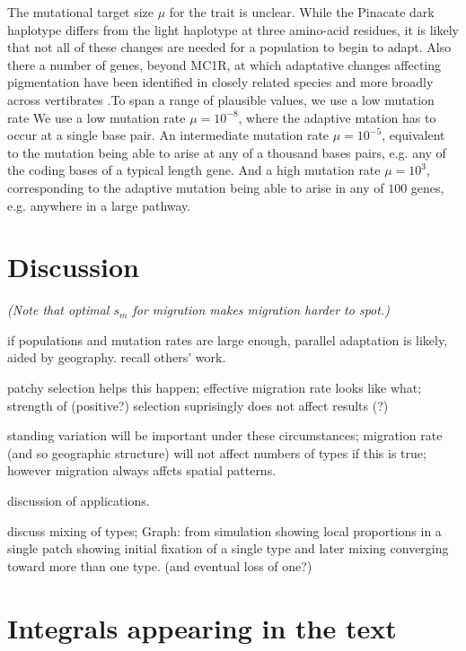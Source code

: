\documentclass{article}
\newcommand{\plr}[1]{{\it\color{blue}(#1)}}
\begin{document}
The mutational target size $\mu$ for the trait is unclear. 
While the Pinacate dark haplotype differs from the light haplotype at three amino-acid residues,
it is likely that not all of these changes are needed for a population to begin to  
adapt. Also there a number of genes, beyond MC1R, at which adaptative changes affecting 
pigmentation have been identified in closely related species and more
broadly across vertibrates \citep{}.To span a range of plausible
values, we use a low mutation rate 
We use a low mutation rate $\mu= 10^{-8}$, where the adaptive
mtation has to occur at a single base pair.
An intermediate mutation rate $\mu= 10^{-5}$, equivalent to
the mutation being able to arise at any of a thousand bases pairs,
e.g. any of the coding bases of a typical length gene. And a high
mutation rate $\mu = 10^{3}$, corresponding to the adaptive mutation
being able to arise in any of $100$ genes, e.g. anywhere in a large pathway. 





\section{Discussion} 

\plr{Note that optimal $s_m$ for migration makes migration harder to spot.}

if populations and mutation rates are large enough, parallel adaptation is likely, aided by geography. 
recall others' work. 

patchy selection helps this happen; 
effective migration rate looks like what; 
strength of (positive?) selection suprisingly does not affect results (?) 

standing variation will be important under these circumstances; 
migration rate (and so geographic structure) will not affect numbers of types if this is true; 
however migration always affcts spatial patterns. 

discussion of applications. 

discuss mixing of types; 
Graph: from simulation showing local proportions in a single patch showing initial fixation of a single type and later mixing converging toward more than one type.  (and eventual loss of one?)



\appendix

\section{Integrals appearing in the text}
    \label{apx:integrals}
\end{document}
